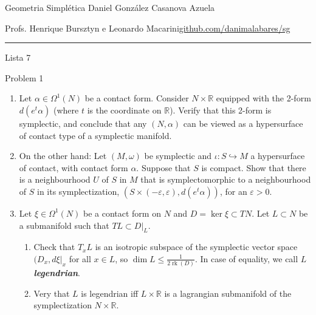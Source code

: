 
\usepackage[style=authortitle-terse,backend=bibtex]{biblatex}




\begin{minipage}{\textwidth}
	\begin{minipage}{1\textwidth}
		Geometria Simpl\'etica \hfill Daniel González Casanova Azuela
		
		{\small Profs. Henrique Bursztyn e Leonardo Macarini\hfill\href{https://github.com/danimalabares/sg}{github.com/danimalabares/sg}}
	\end{minipage}
\end{minipage}\vspace{.2cm}\hrule

\vspace{10pt}
{\huge Lista 7}

\tableofcontents
\vspace{1em}

\begin{thing4}{Problem 1}\leavevmode
\begin{enumerate}[label=(\alph*)]
\item Let  $\alpha \in \Omega^{1}(N)$ be a contact form. Consider $N \times \mathbb{R}$ equipped with the 2-form $d(e^t\alpha)$ (where $t$ is the coordinate on $\mathbb{R}$). Verify that this 2-form is symplectic, and conclude that any $(N,\alpha)$ can be viewed as a hypersurface of contact type of a symplectic manifold.

\item On the other hand: Let $(M,\omega)$ be symplectic and $\iota:S\hookrightarrow M$ a hypersurface of contact, with contact form $\alpha$. Suppose that $S$ is compact. Show that there is a neighbourhood $U$ of $S$ in $M$ that is symplectomorphic to a neighbourhood of $S$ in its symplectization, $(S \times (-\varepsilon, \varepsilon), d (e^t \alpha))$, for an $\varepsilon>0$.

\item Let $\xi \in \Omega^{1}(N)$ be a contact form on $N$ and $D=\ker \xi\subset TN$. Let $ L \subset N$ be a submanifold such that $ TL \subset D|_{ L}$.
	\begin{enumerate}[label=(\arabic*)]
	\item Check that $T_x L$ is an isotropic subspace of the symplectic vector space  $(D_x, d \xi|_{x}$ for all $x \in L$, so  $ \dim L \leq  \frac{1}{2 \operatorname{rk}(D)}$. In case of equality, we call $L$ \textit{\textbf{legendrian}}.
	\item Very that $L$ is legendrian iff $L \times \mathbb{R}$ is a lagrangian submanifold of the symplectization  $ N \times \mathbb{R}$.
	\end{enumerate}
\end{enumerate}
\end{thing4}

